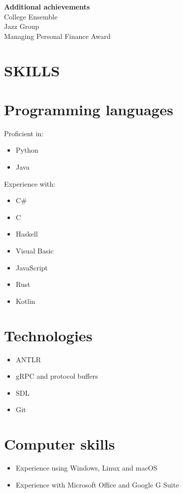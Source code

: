 \documentclass[margin]{res}
\begin{document}
\begin{resume}
{\bf Additional achievements} \\
College Ensemble \\
Jazz Group \\
Managing Personal Finance Award

\section{SKILLS}

\normalsize{\section{Programming languages}}
Proficient in:
\begin{itemize}
\item Python
\item Java
\end{itemize}

\begin{samepage}
Experience with:
\begin{itemize}
\item C\#
\item C
\item Haskell
\item Visual Basic
\item JavaScript
\item Rust
\item Kotlin
\end{itemize}
\end{samepage}

\normalsize{\section{Technologies}}
\begin{itemize}
\item ANTLR
\item gRPC and protocol buffers
\item SDL
\item Git
\end{itemize}

\normalsize{\section{Computer skills}}
\begin{itemize}
\item Experience using Windows, Linux and macOS
\item Experience with Microsoft Office and Google G Suite
\end{itemize}


\end{resume}
\end{document}
